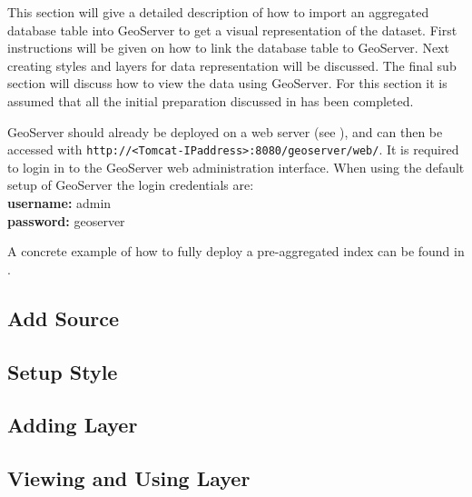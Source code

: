 This section will give a detailed description of how to import an aggregated database table into GeoServer to get a visual representation of the dataset. First instructions will be given on how to link the database table to GeoServer. Next creating styles and layers for data representation will be discussed. The final sub section will discuss how to view the data using GeoServer.  For this section it is assumed that all the initial preparation discussed in  has been completed.

GeoServer should already be deployed on a web server (see ), and can then be accessed with \lstinline|http://<Tomcat-IPaddress>:8080/geoserver/web/|. It is required to login in to the GeoServer web administration interface. When using the default setup of GeoServer the login credentials are: \\
\indent \textbf{username:} admin \\
\indent \textbf{password:} geoserver

\noindent A concrete example of how to fully deploy a pre-aggregated index can be found in .

\subsection{Add Source}
\label{sec:addingsource}

\pagebreak

\subsection{Setup Style}
\label{sec:addingstyle}


\subsection{Adding Layer}
\label{sec:addinglayers}


\subsection{Viewing and Using Layer}
